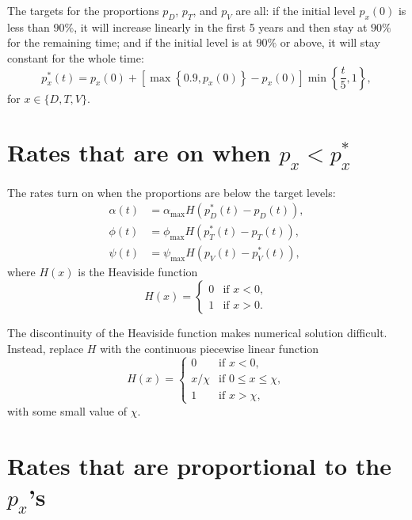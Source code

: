 \documentclass{article}
\begin{document}
The targets for the proportions $p_D$, $p_T$, and $p_V$ are all:
if the initial level $p_x(0)$ is less than $90\%$, it will increase
linearly in the first 5 years and then stay at $90\%$ for the
remaining time; and if the initial level is at $90\%$ or above, it
will stay constant for the whole time:
\begin{equation}
  p_x^*(t)
  = p_x(0) + \left[
    \max\left\{0.9, p_x(0)\right\} - p_x(0)
  \right]
  \min\left\{\frac{t}{5}, 1\right\},
\end{equation}
for $x \in \{D, T, V\}$.


\section{Rates that are on when $p_x < p^*_x$}

The rates turn on when the proportions are below the target levels:
\begin{equation}
  \begin{split}
    \alpha(t) &= \alpha_{\max} H\left(p_D^*(t) - p_D(t)\right),
    \\
    \phi(t) &= \phi_{\max} H\left(p_T^*(t) - p_T(t)\right),
    \\
    \psi(t) &= \psi_{\max} H\left(p_V(t) - p_V^*(t)\right),
  \end{split}
\end{equation}
where $H(x)$ is the Heaviside function
\begin{equation}
  H(x) =
  \begin{cases}
    0 & \text{if $x < 0$},
    \\
    1 & \text{if $x > 0$}.
  \end{cases}
\end{equation}

The discontinuity of the Heaviside function makes numerical solution
difficult.  Instead, replace $H$ with the continuous piecewise linear
function
\begin{equation}
  H(x) =
  \begin{cases}
    0 & \text{if $x < 0$},
    \\
    x / \chi & \text{if $0 \leq x \leq \chi$},
    \\
    1 & \text{if $x > \chi$},
  \end{cases}
\end{equation}
with some small value of $\chi$.


\section{Rates that are proportional to the $p_x$'s}
\end{document}
